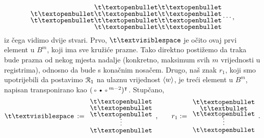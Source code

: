 \begin{equation}
\begin{array}{@{}c@{}}
    \t\textopenbullet\\
    \t\textopenbullet
    \end{array}
    \begin{array}{@{}c@{}}
    \t\textopenbullet\\
    \t\textopenbullet\\
    \t\textopenbullet\\
    \t\textopenbullet
    \end{array}
    \begin{array}{@{}c@{}}
    \t\textopenbullet\\
    \t\textopenbullet\\
    \t\textopenbullet\\
    \t\textopenbullet
    \end{array}\dotsm\text,
\end{equation}
iz čega vidimo dvije stvari. Prvo, $\bl$ je očito ovaj prvi element u $B^m$, koji ima sve kružiće prazne. Tako direktno postižemo da traka bude prazna od nekog mjesta nadalje (konkretno, maksimum svih $m$ vrijednosti u registrima), odnosno da bude s konačnim nosačem. Drugo, naš znak $r_1$, koji smo upotrijebili da postavimo $\mathcal R_{1}$ na ulaznu vrijednost $\langle w\rangle$, je treći element u $B^m$, napisan transponirano kao $(\text{\textopenbullet\textbullet\textopenbullet}^{m-2})^\intercal$. Stupčano,
\begin{equation}
\renewcommand{\arraystretch}{0.1}
    \bl\,:=\begin{array}{c}
    \t\textopenbullet\\
    \t\textopenbullet\\
        \t\textopenbullet\\[-1.5mm]
        \vdotswithin{\t\textopenbullet}\\[1mm]
    \t\textopenbullet
    \end{array}\text{,\qquad}
    r_1:=\begin{array}{c}
    \t\textopenbullet\\
    \t\textbullet\\
        \t\textopenbullet\\[-1.5mm]
        \vdotswithin{\t\textopenbullet}\\[1mm]
    \t\textopenbullet
    \end{array}\text.
\end{equation}

